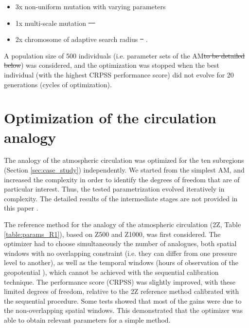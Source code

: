 \documentclass[review]{elsarticle}
\providecommand{\DIFaddtex}[1]{{\protect\color{blue}\uwave{#1}}} %
\providecommand{\DIFdeltex}[1]{{\protect\color{red}\sout{#1}}}                      %
\providecommand{\DIFaddbegin}{} %
\providecommand{\DIFaddend}{} %
\providecommand{\DIFdelbegin}{} %
\providecommand{\DIFdelend}{} %
\providecommand{\DIFadd}[1]{\texorpdfstring{\DIFaddtex{#1}}{#1}} %
\providecommand{\DIFdel}[1]{\texorpdfstring{\DIFdeltex{#1}}{}} %
\begin{document}
\begin{itemize}
	\item 3x non-uniform mutation \citep{Michalewicz1996} with varying parameters
	\item 1x multi-scale mutation \DIFdelbegin \DIFdel{\mbox{%
\citep{Horton2016}
	}%
}\DIFdelend \DIFaddbegin \DIFadd{\mbox{%
\citep{Horton2017}
	}%
}\DIFaddend \item 2x chromosome of adaptive search radius \DIFdelbegin \DIFdel{\mbox{%
\citep{Horton2016}}%
}\DIFdelend \DIFaddbegin \DIFadd{\mbox{%
\citep{Horton2017}}%
}\DIFaddend .
\end{itemize}

A population size of 500 individuals (i.e. parameter sets of the AM\DIFdelbegin \DIFdel{to be detailed below}\DIFdelend ) was considered, and the optimization was stopped when the best individual (with the highest CRPSS performance score) did not evolve for 20 generations (cycles of optimization).


\section{Optimization of the circulation analogy}
\label{sec:optim_circul}

The analogy of the atmospheric circulation was optimized for the ten subregions (Section \ref{sec:case_study}) independently. We started from the simplest AM, and increased the complexity in order to identify the degrees of freedom that are of particular interest. Thus, the tested parametrization evolved iteratively in complexity. The detailed results of the intermediate stages are not provided in this paper \citep[see][for the details]{Horton2012a}.

The reference method for the analogy of the atmospheric circulation (2Z, Table \ref{table:params_R1}), based on Z500 and Z1000, was first considered. The optimizer had to choose simultaneously the number of analogues, both spatial windows with no overlapping constraint (i.e. they can differ from one pressure level to another), as well as the temporal windows (hours of observation of the geopotential \DIFaddbegin \DIFadd{height}\DIFaddend ), which cannot be achieved with the sequential calibration technique. The performance score (CRPSS) was slightly improved, with these limited degrees of freedom, relative to the 2Z reference method calibrated with the sequential procedure. Some tests showed that most of the gains were due to the non-overlapping spatial windows. This demonstrated that the optimizer was able to obtain relevant parameters for a simple method.
\end{document}
